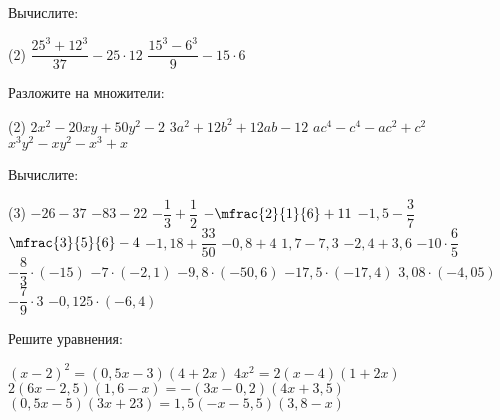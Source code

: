 \begin{homework}[number=1]
	\begin{listofex}
		\item Вычислите:
		\begin{tasks}(2)
			\task \( \dfrac{ 25^3+12^3 }{ 37 }-25\cdot12 \)
			\task \( \dfrac{ 15^3-6^3 }{ 9 }-15\cdot6 \)
		\end{tasks}
		\item Разложите на множители: %
		\begin{tasks}(2)
			\task \( 2x^2-20xy+50y^2-2 \)
			\task \( 3a^2+12b^2+12ab-12 \)
			\task \( ac^4-c^4-ac^2+c^2 \)
			\task \( x^3y^2-xy^2-x^3+x \)
		\end{tasks}
		\item Вычислите:
		\begin{tasks}(3)
			\task \( -26-37 \)
			\task \( -83-22 \)
			\task \( -\dfrac{1}{3}+\dfrac{1}{2} \)
			\task \( -\mfrac{2}{1}{6}+11 \)
			\task \( -1,5-\dfrac{3}{7} \)
			\task \( \mfrac{3}{5}{6}-4 \)
			\task \( -1,18+\dfrac{33}{50} \)
			\task \( -0,8+4 \)
			\task \( 1,7-7,3 \)
			\task \( -2,4+3,6 \)
			\task \( -10 \cdot \dfrac{6}{5} \)
			\task \( -\dfrac{8}{3} \cdot (-15) \)
			\task \( -7 \cdot (-2,1) \)
			\task \( -9,8 \cdot (-50,6) \)
			\task \( -17,5 \cdot (-17,4) \)
			\task \( 3,08 \cdot (-4,05) \)
			\task \( -\dfrac{7}{9}\cdot 3 \)
			\task \( -0,125 \cdot (-6,4) \)
		\end{tasks}
		\item Решите уравнения:
		\begin{tasks}
			\task \( (x-2)^2=(0,5x-3)(4+2x) \)
			\task \( 4x^2=2(x-4)(1+2x) \)
			\task \( 2(6x-2,5)(1,6-x)=-(3x-0,2)(4x+3,5) \)
			\task \( (0,5x-5)(3x+23)=1,5(-x-5,5)(3,8-x) \)
		\end{tasks}
	\end{listofex}
\end{homework}


